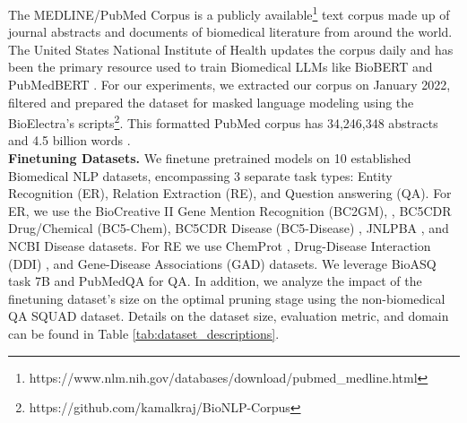The MEDLINE/PubMed Corpus is a publicly available\footnote{https://www.nlm.nih.gov/databases/download/pubmed\_medline.html} text corpus made up of journal abstracts and documents of biomedical literature from around the world. The United States National Institute of Health updates the corpus daily and has been the primary resource used to train Biomedical LLMs like BioBERT \cite{Lee2020BioBERTAP} and PubMedBERT \cite{Gu2022DomainSpecificLM}. For our experiments, we extracted our corpus on January 2022, filtered and prepared the dataset for masked language modeling using the BioElectra's \cite{Kanakarajan2021BioELECTRAPretrainedBT} scripts\footnote{https://github.com/kamalkraj/BioNLP-Corpus}. This formatted PubMed corpus has 34,246,348 abstracts and 4.5 billion words \cite{Kanakarajan2021BioELECTRAPretrainedBT}. \\
\textbf{Finetuning Datasets.} We finetune pretrained models on 10 established Biomedical NLP datasets, encompassing 3 separate task types: Entity Recognition (ER), Relation Extraction (RE), and Question answering (QA). For ER, we use the BioCreative II Gene Mention Recognition (BC2GM), \cite{Smith2008OverviewOB}, BC5CDR Drug/Chemical (BC5-Chem), BC5CDR Disease (BC5-Disease) \cite{Li2016BioCreativeVC}, JNLPBA \cite{Collier2004IntroductionTT}, and NCBI Disease \cite{Dogan2014NCBIDC} datasets. For RE we use ChemProt \cite{Taboureau2011ChemProtAD}, Drug-Disease Interaction (DDI) \cite{HerreroZazo2013TheDC}, and Gene-Disease Associations (GAD) \cite{Becker2004TheGA} datasets. We leverage BioASQ task 7B \cite{Baker2016AutomaticSC} and PubMedQA \cite{Jin2019PubMedQAAD} for QA. In addition, we analyze the impact of the finetuning dataset's size on the optimal pruning stage using the non-biomedical QA SQUAD \cite{Rajpurkar2016SQuAD1Q} dataset. Details on the dataset size, evaluation metric, and domain can be found in Table \ref{tab:dataset_descriptions}.\\
